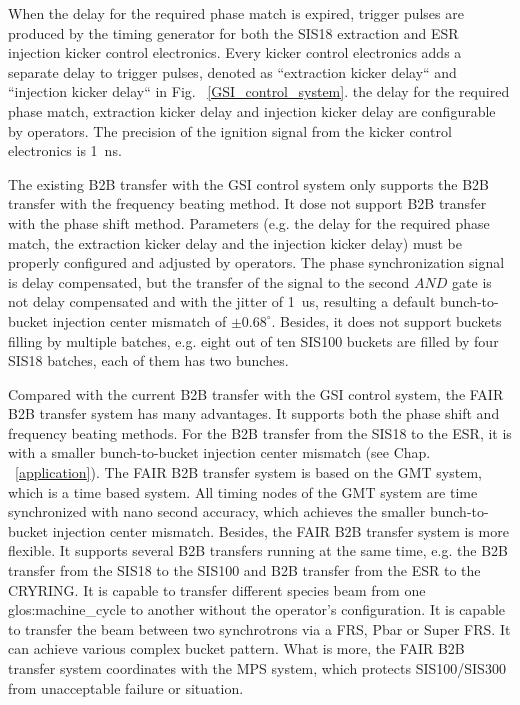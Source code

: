 When the delay for the required phase match is expired, trigger pulses are produced by the timing generator for both the SIS18 extraction and ESR injection kicker control electronics. Every kicker control electronics adds a separate delay to trigger pulses, denoted as ``extraction kicker delay`` and ``injection kicker delay`` in Fig. ~\ref{GSI_control_system}. the delay for the required phase match, extraction kicker delay and injection kicker delay are configurable by operators. The precision of the ignition signal from the kicker control electronics is \SI{1}{ns}. 

The existing B2B transfer with the GSI control system only supports the B2B transfer with the frequency beating method. It dose not support B2B transfer with the phase shift method. Parameters (e.g. the delay for the required phase match, the extraction kicker delay and the injection kicker delay) must be properly configured and adjusted by operators. The phase synchronization signal is delay compensated, but the transfer of the signal to the second $\textit{AND}$ gate is not delay compensated and with the jitter of \SI{1}{us}, resulting a default bunch-to-bucket injection center mismatch of $\pm 0.68^\circ$. Besides, it does not support buckets filling by multiple batches, e.g. eight out of ten SIS100 buckets are filled by four SIS18 batches, each of them has two bunches.

Compared with the current B2B transfer with the GSI control system, the FAIR B2B transfer system has many advantages. It supports both the phase shift and frequency beating methods. For the B2B transfer from the SIS18 to the ESR, it is with a smaller bunch-to-bucket injection center mismatch (see Chap. ~\ref{application}). The FAIR B2B transfer system is based on the GMT system, which is a time based system. All timing nodes of the GMT system are time synchronized with nano second accuracy, which achieves the smaller bunch-to-bucket injection center mismatch. Besides, the FAIR B2B transfer system is more flexible. It supports several B2B transfers running at the same time, e.g. the B2B transfer from the SIS18 to the SIS100 and B2B transfer from the ESR to the CRYRING. It is capable to transfer different species beam from one \gls{glos:machine_cycle} to another without the operator's configuration. It is capable to transfer the beam between two synchrotrons via a \gls{FRS}, Pbar or Super FRS. It can achieve various complex bucket pattern. What is more, the FAIR B2B transfer system coordinates with the MPS system, which protects SIS100/SIS300 from unacceptable failure or situation. 

